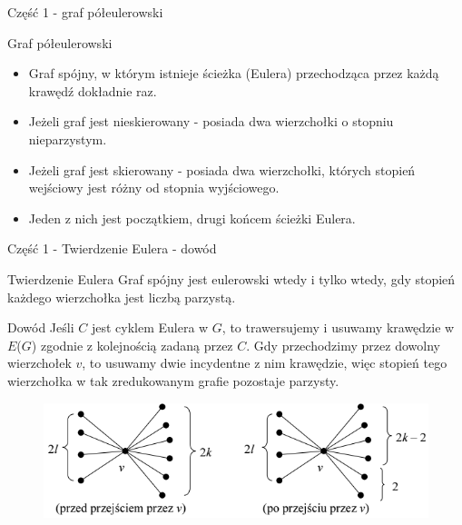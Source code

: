 \documentclass[polish,envcountsect,10pt]{beamer}
\begin{document}
\begin{frame}{Część 1 - graf półeulerowski}
    \begin{block}{Graf półeulerowski}
        \begin{itemize}
            \item Graf spójny, w którym istnieje ścieżka (Eulera) przechodząca przez każdą krawędź dokładnie raz.
            \item Jeżeli graf jest nieskierowany - posiada dwa wierzchołki o stopniu nieparzystym.
            \item Jeżeli graf jest skierowany - posiada dwa wierzchołki, których stopień wejściowy jest różny od stopnia wyjściowego.
            \item Jeden z nich jest początkiem, drugi końcem ścieżki Eulera.
        \end{itemize}
    \end{block}
    \begin{center}
    \end{center}
\end{frame}

\begin{frame}{Część 1 - Twierdzenie Eulera - dowód}
\begin{block}{Twierdzenie Eulera}
    Graf spójny jest eulerowski wtedy i tylko wtedy, gdy
    stopień każdego wierzchołka jest liczbą parzystą.
\end{block}
\begin{block}{Dowód}
    Jeśli $C$ jest cyklem Eulera w $G$, to trawersujemy i usuwamy
    krawędzie w $E$($G$) zgodnie z kolejnością zadaną przez $C$. Gdy przechodzimy
    przez dowolny wierzchołek $v$, to usuwamy dwie incydentne z nim krawędzie,
    więc stopień tego wierzchołka w tak zredukowanym grafie pozostaje
    parzysty.
\end{block}
\begin{figure}
    \centering
    \includegraphics[width=0.7\linewidth]{./zal_b.png}
\end{figure}
\end{frame}
\end{document}
